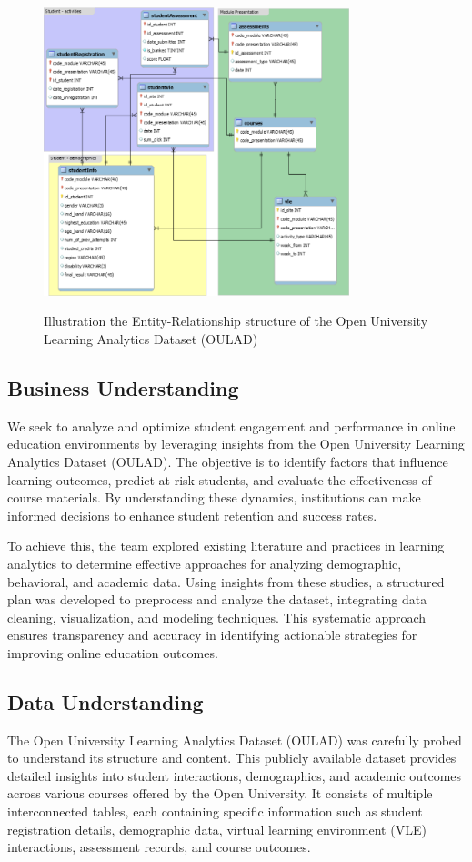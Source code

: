 \begin{figure}
  \begin{center}
  \includegraphics[width=3.5in]{photo/schema.PNG}\\
  \caption{Illustration the Entity-Relationship structure of the Open University Learning Analytics Dataset (OULAD)}
  \label{pu_image}
  \end{center}
\end{figure}


\subsection*{Business Understanding}

We seek to analyze and optimize student engagement and performance in online education environments by leveraging insights from the Open University Learning Analytics Dataset (OULAD). The objective is to identify factors that influence learning outcomes, predict at-risk students, and evaluate the effectiveness of course materials. By understanding these dynamics, institutions can make informed decisions to enhance student retention and success rates. 

To achieve this, the team explored existing literature and practices in learning analytics to determine effective approaches for analyzing demographic, behavioral, and academic data. Using insights from these studies, a structured plan was developed to preprocess and analyze the dataset, integrating data cleaning, visualization, and modeling techniques. This systematic approach ensures transparency and accuracy in identifying actionable strategies for improving online education outcomes.


\subsection*{Data Understanding}
The Open University Learning Analytics Dataset (OULAD) was carefully probed to understand its structure and content. This publicly available dataset provides detailed insights into student interactions, demographics, and academic outcomes across various courses offered by the Open University. It consists of multiple interconnected tables, each containing specific information such as student registration details, demographic data, virtual learning environment (VLE) interactions, assessment records, and course outcomes.

